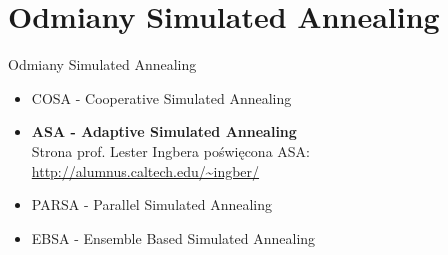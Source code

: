 \section{Odmiany Simulated Annealing}
	\begin{frame}{Odmiany Simulated Annealing}
		\begin{itemize}
			\item COSA - Cooperative Simulated Annealing
			
			\item \textbf{ASA - Adaptive Simulated Annealing}\\			
			Strona prof. Lester Ingbera poświęcona ASA:\\
				\url{http://alumnus.caltech.edu/~ingber/}
			
			
			
			\item PARSA - Parallel Simulated Annealing
			
			\item EBSA - Ensemble Based Simulated Annealing
		\end{itemize}

		
	\end{frame}